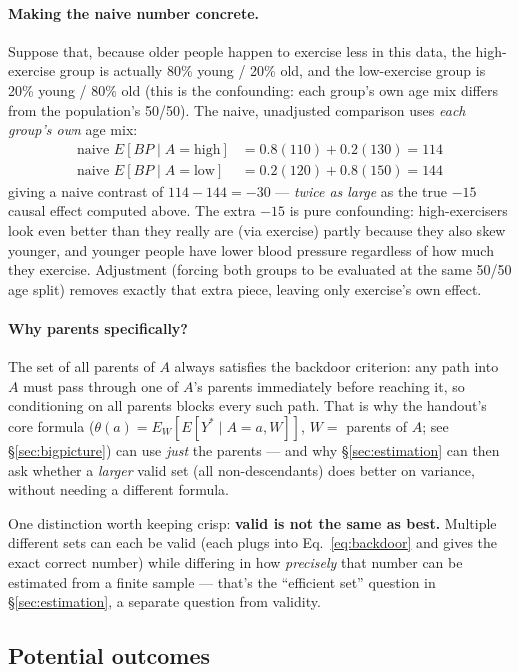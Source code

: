 \paragraph{Making the naive number concrete.} Suppose that, because older
people happen to exercise less in this data, the high-exercise group is
actually 80\% young / 20\% old, and the low-exercise group is 20\% young /
80\% old (this is the confounding: each group's own age mix differs from
the population's 50/50). The naive, unadjusted comparison uses \emph{each
group's own} age mix:
\begin{align*}
  \text{naive } E[BP\mid A{=}\text{high}] &= 0.8(110) + 0.2(130) = 114 \\
  \text{naive } E[BP\mid A{=}\text{low}]  &= 0.2(120) + 0.8(150) = 144
\end{align*}
giving a naive contrast of $114-144=-30$ --- \emph{twice as large} as the
true $-15$ causal effect computed above. The extra $-15$ is pure
confounding: high-exercisers look even better than they really are (via
exercise) partly because they also skew younger, and younger people have
lower blood pressure regardless of how much they exercise. Adjustment
(forcing both groups to be evaluated at the same 50/50 age split) removes
exactly that extra piece, leaving only exercise's own effect.

\paragraph{Why parents specifically?} The set of all parents of $A$ always
satisfies the backdoor criterion: any path into $A$ must pass through one of
$A$'s parents immediately before reaching it, so conditioning on all parents
blocks every such path. That is why the handout's core formula
($\theta(a) = E_W[E[Y^* \mid A=a, W]]$, $W = $ parents of $A$; see
\S\ref{sec:bigpicture}) can use \emph{just} the parents --- and why
\S\ref{sec:estimation} can then ask whether a \emph{larger} valid set (all
non-descendants) does better on variance, without needing a different
formula.

One distinction worth keeping crisp: \textbf{valid is not the same as
best.} Multiple different sets can each be valid (each plugs into
Eq.~\ref{eq:backdoor} and gives the exact correct number) while differing
in how \emph{precisely} that number can be estimated from a finite sample
--- that's the ``efficient set'' question in \S\ref{sec:estimation}, a
separate question from validity.

\subsection{Potential outcomes}

